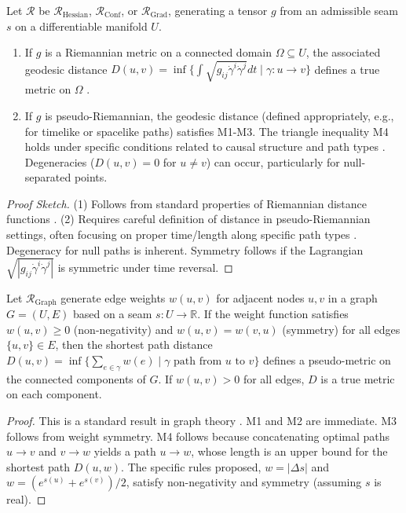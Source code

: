 \documentclass[twoside,twocolumn]{article}
\begin{document}
\begin{proposition} \label{prop:diff_metric_props}
Let \( \mathcal{R} \) be \( \mathcal{R}_{\text{Hessian}} \), \( \mathcal{R}_{\text{Conf}} \), or \( \mathcal{R}_{\text{Grad}} \), generating a tensor \( g \) from an admissible seam \( s \) on a differentiable manifold \( U \).
\begin{enumerate}
    \item If \( g \) is a Riemannian metric on a connected domain \( \Omega \subseteq U \), the associated geodesic distance \( D(u, v) = \inf \{\int \sqrt{g_{ij}\dot{\gamma}^i\dot{\gamma}^j} dt \mid \gamma: u \to v\} \) defines a true metric on \( \Omega \) \cite{Petersen2006, Lee2018}. %
    \item If \( g \) is pseudo-Riemannian, the geodesic distance (defined appropriately, e.g., for timelike or spacelike paths) satisfies M1-M3. The triangle inequality M4 holds under specific conditions related to causal structure and path types \cite{ONeill1983,BeemEhrlichEasley1996}. %
    Degeneracies (\( D(u,v)=0 \) for \( u \neq v \)) can occur, particularly for null-separated points.
\end{enumerate}
\end{proposition}
\begin{proof}[Proof Sketch]
(1) Follows from standard properties of Riemannian distance functions \cite{Petersen2006, Lee2018}. %
(2) Requires careful definition of distance in pseudo-Riemannian settings, often focusing on proper time/length along specific path types \cite{ONeill1983,BeemEhrlichEasley1996}. %
Degeneracy for null paths is inherent. Symmetry follows if the Lagrangian \( \sqrt{|g_{ij}\dot{\gamma}^i\dot{\gamma}^j|} \) is symmetric under time reversal.
\end{proof}

\begin{proposition} \label{prop:graph_metric_props}
Let \( \mathcal{R}_{\text{Graph}} \) generate edge weights \( w(u, v) \) for adjacent nodes \( u, v \) in a graph \( G=(U, E) \) based on a seam \( s: U \to \mathbb{R} \). If the weight function satisfies \( w(u, v) \ge 0 \) (non-negativity) and \( w(u, v) = w(v, u) \) (symmetry) for all edges \( \{u, v\} \in E \), then the shortest path distance \( D(u, v) = \inf \{\sum_{e \in \gamma} w(e) \mid \gamma \text{ path from } u \text{ to } v\} \) defines a pseudo-metric on the connected components of \( G \). If \( w(u,v)>0 \) for all edges, \( D \) is a true metric on each component.
\end{proposition}
\begin{proof}
This is a standard result in graph theory \cite{Chung1997}. %
M1 and M2 are immediate. M3 follows from weight symmetry. M4 follows because concatenating optimal paths \( u \to v \) and \( v \to w \) yields a path \( u \to w \), whose length is an upper bound for the shortest path \( D(u,w) \). The specific rules proposed, \( w=|\Delta s| \) and \( w=(e^{s(u)}+e^{s(v)})/2 \), satisfy non-negativity and symmetry (assuming \( s \) is real).
\end{proof}
\end{document}
